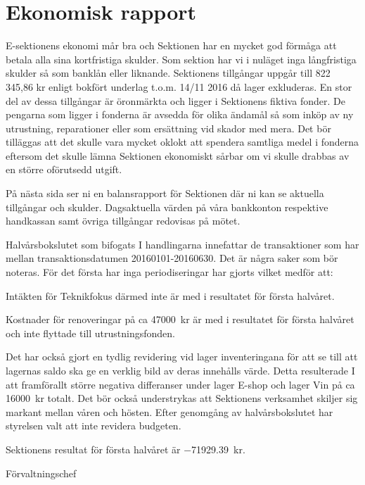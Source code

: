 \documentclass[../_main/handlingar.tex]{subfiles}
\begin{document}
\section{Ekonomisk rapport}

E-sektionens ekonomi mår bra och Sektionen har en mycket god förmåga att betala alla sina kortfristiga skulder. Som sektion har vi i nuläget inga långfristiga skulder så som banklån eller liknande. Sektionens tillgångar uppgår till 822 345,86 kr enligt bokfört underlag t.o.m. 14/11 2016 då lager exkluderas. En stor del av dessa tillgångar är öronmärkta och ligger i Sektionens fiktiva fonder. De pengarna som ligger i fonderna är avsedda för olika ändamål så som inköp av ny utrustning, reparationer eller som ersättning vid skador med mera. Det bör tilläggas att det skulle vara mycket oklokt att spendera samtliga medel i fonderna eftersom det skulle lämna Sektionen ekonomiskt sårbar om vi skulle drabbas av en större oförutsedd utgift.

På nästa sida ser ni en balansrapport för Sektionen där ni kan se aktuella tillgångar och skulder. Dagsaktuella värden på våra bankkonton respektive handkassan samt övriga tillgångar redovisas på mötet.

Halvårsbokslutet som bifogats I handlingarna innefattar de transaktioner som har mellan transaktionsdatumen 20160101-20160630. Det är några saker som bör noteras. För det första har inga periodiseringar har gjorts vilket medför att:
\begin{dashlist}
\item Intäkten för Teknikfokus därmed inte är med i resultatet för första halvåret.
\item Kostnader för renoveringar på ca \SI{47000}{kr} är med i resultatet för första halvåret och inte flyttade till utrustningsfonden.
\end{dashlist}

Det har också gjort en tydlig revidering vid lager inventeringana för att se till att lagernas saldo ska ge en verklig bild av deras innehålls värde. Detta resulterade I att framförallt större negativa differanser under lager E-shop och lager Vin på ca \SI{16000}{kr} totalt.  Det bör också understrykas att Sektionens verksamhet skiljer sig markant mellan våren och hösten. Efter genomgång av halvårsbokslutet har styrelsen valt att inte revidera budgeten.

Sektionens resultat för första halvåret är \SI{-71929.39}{kr}.

\begin{signatures}{1}
    \mvh
    \signature{Anders Nilsson}{Förvaltningschef}
\end{signatures}
\end{document}

